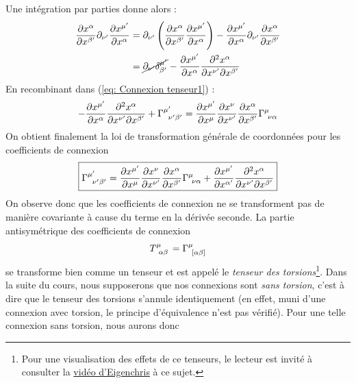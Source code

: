 Une intégration par parties donne alors :
\begin{align}
    \frac{\partial x^{\alpha}}{\partial x^{\beta '}}\partial_{\nu '} \frac{\partial x^{\mu '}}{\partial x^{\alpha}} &= \partial_{\nu '}\left(\frac{\partial x^{\alpha}}{\partial x^{\beta '}}\frac{\partial x^{\mu '}}{\partial x^{\alpha}}\right) - \frac{\partial x^{\mu '}}{\partial x^{\alpha}} \partial_{\nu '}\frac{\partial x^{\alpha}}{\partial x^{\beta '}} \\
    &= \cancel{\partial_{\nu '} \delta^{\mu'}_{\beta'}} - \frac{\partial x^{\mu '}}{\partial x^{\alpha}}\frac{\partial^2 x^{\alpha}}{\partial x^{\nu '}\partial x^{\beta '}} 
\end{align}
En recombinant dans (\ref{eq: Connexion tenseur1}) :
\begin{equation}
    - \frac{\partial x^{\mu '}}{\partial x^{\alpha}}\frac{\partial^2 x^{\alpha}}{\partial x^{\nu '}\partial x^{\beta '}} +\Gamma\indices{^{\mu '}_{\!\!\nu '\beta '}} = \frac{\partial x^{\mu'}}{\partial x^{\mu}}\frac{\partial x^{\nu}}{\partial x^{\nu '}}\frac{\partial x^{\alpha}}{\partial x^{\beta '}} \Gamma\indices{^{\mu}_{\!\nu \alpha}} 
\end{equation}
 On obtient finalement la loi de transformation générale de coordonnées pour les coefficients de connexion
\begin{equation}
    \boxed{\Gamma\indices{^{\mu '}_{\!\!\nu '\beta '}} = \frac{\partial x^{\mu'}}{\partial x^{\mu}}\frac{\partial x^{\nu}}{\partial x^{\nu '}}\frac{\partial x^{\alpha}}{\partial x^{\beta '}} \Gamma\indices{^{\mu}_{\!\nu \alpha}} +\frac{\partial x^{\mu '}}{\partial x^{\alpha '}}\frac{\partial ^2 x^{\alpha}}{\partial x^{\nu'}\partial x^{\beta '}} }
\end{equation}
On observe donc que les coefficients de connexion ne se transforment pas de manière covariante à cause du terme en la dérivée seconde. La partie antisymétrique des coefficients de connexion
\begin{equation}
    T\indices{^\mu_{\!\alpha\beta}} = \Gamma\indices{^\mu_{\![\alpha\beta]}}
\end{equation}
se transforme bien comme un tenseur et est appelé le \emph{tenseur des torsions}\footnote{Pour une visualisation des effets de ce tenseurs, le lecteur est invité à consulter la \href{https://www.youtube.com/watch?v=SfOiOPuS2_U}{vidéo d'Eigenchris} à ce sujet.}. Dans la suite du cours, nous supposerons que nos connexions sont \emph{sans torsion}, c'est à dire que le tenseur des torsions s'annule identiquement (en effet, muni d'une connexion avec torsion, le principe d'équivalence n'est pas vérifié). Pour une telle connexion sans torsion, nous aurons donc
